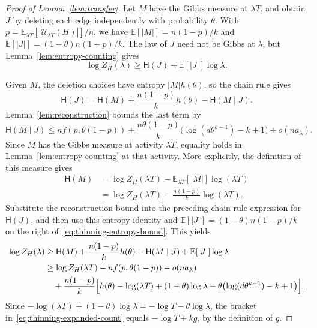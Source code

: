 \documentclass[11pt,reqno]{amsart}
\numberwithin{equation}{section}
\theoremstyle{plain}
\theoremstyle{definition}
\newcommand{\E}{\mathbb E}
\newcommand{\HH}{\mathsf H}
\newcommand{\calU}{\mathcal U}
\begin{document}
\begin{proof}[Proof of Lemma~\ref{lem:transfer}]
    Let $M$ have the Gibbs measure at $\lambda T$, and obtain $J$ by deleting each edge independently with probability $\theta$.
    With $p=\E_{\lambda T}[|\calU_{\lambda T}(H)|]/n$, we have $\E[|M|]=n(1-p)/k$ and $\E[|J|]=(1-\theta)n(1-p)/k$.
    The law of $J$ need not be Gibbs at $\lambda$, but Lemma~\ref{lem:entropy-counting} gives
    \begin{equation}\label{eq:thinning-entropy-bound}
        \log Z_H(\lambda)\ge\HH(J)+\E[|J|]\log\lambda.
    \end{equation}

    Given $M$, the deletion choices have entropy $|M|h(\theta)$, so the chain rule gives
    \[
        \HH(J)=\HH(M)+\frac{n(1-p)}k h(\theta)-\HH(M\mid J).
    \]
    Lemma~\ref{lem:reconstruction} bounds the last term by
    \[
        \HH(M\mid J)\le nf(p,\theta(1-p))
        +\frac{n\theta(1-p)}k\bigl(\log(d\theta^{k-1})-k+1\bigr)+o(na_\lambda).
    \]
    Since $M$ has the Gibbs measure at activity $\lambda T$, equality holds in Lemma~\ref{lem:entropy-counting} at that activity.
    More explicitly, the definition of this measure gives
    \[
        \begin{aligned}
            \HH(M)
            &=\log Z_H(\lambda T)-\E_{\lambda T}[|M|]\log(\lambda T)\\
            &=\log Z_H(\lambda T)-\frac{n(1-p)}k\log(\lambda T).
        \end{aligned}
    \]
    Substitute the reconstruction bound into the preceding chain-rule expression for $\HH(J)$, and then use this entropy identity and $\E[|J|]=(1-\theta)n(1-p)/k$ on the right of~\eqref{eq:thinning-entropy-bound}.
    This yields
    \begin{equation}\label{eq:thinning-expanded-count}
        \begin{aligned}
            \log Z_H(\lambda)
            &\geq \HH(M)+\frac{n(1-p)}k h(\theta)-\HH(M\mid J)+\E[|J|]\log\lambda\\
            &\geq \log Z_H(\lambda T)-nf(p,\theta(1-p))-o(na_\lambda)\\
            &\quad+\frac{n(1-p)}k\Bigl[h(\theta)-\log(\lambda T)+(1-\theta)\log\lambda-\theta\bigl(\log(d\theta^{k-1})-k+1\bigr)\Bigr].
        \end{aligned}
    \end{equation}
    Since $-\log(\lambda T)+(1-\theta)\log\lambda=-\log T-\theta\log\lambda$, the bracket in~\eqref{eq:thinning-expanded-count} equals $-\log T+kg$, by the definition of $g$.

\end{proof}
\end{document}
